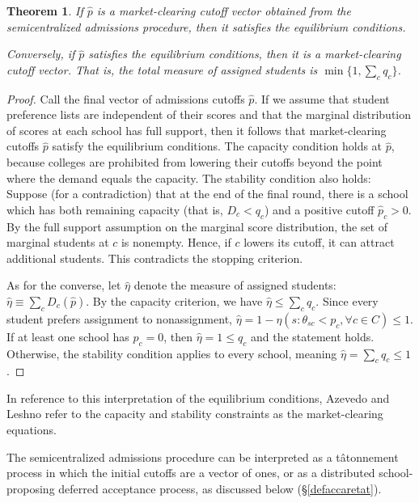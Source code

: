 \documentclass[12pt]{article}
\newtheorem{theorem}{Theorem}
\theoremstyle{definition}
\begin{document}
\begin{theorem}
If $\hat p$ is a market-clearing cutoff vector obtained from the semicentralized admissions procedure, then it satisfies the equilibrium conditions.

Conversely, if $\hat p$ satisfies the equilibrium conditions, then it is a market-clearing cutoff vector. That is, the total measure of assigned students is $\min\{1, \sum_c q_c\}$. 
\end{theorem}

\begin{proof}Call the final vector of admissions cutoffs $\hat p$. If we assume that student preference lists are independent of their scores and that the marginal distribution of scores at each school has full support, then it follows that market-clearing cutoffs $\hat p$ satisfy the equilibrium conditions. The capacity condition holds at $\hat p$, because colleges are prohibited from lowering their cutoffs beyond the point where the demand equals the capacity. The stability condition also holds: Suppose (for a contradiction) that at the end of the final round, there is a school which has both remaining capacity (that is, $D_c < q_c$) and a positive cutoff $\hat p_c > 0$. By the full support assumption on the marginal score distribution, the set of marginal students at $c$ is nonempty. Hence, if $c$ lowers its cutoff, it can attract additional students. This contradicts the stopping criterion.

As for the converse, let $\hat \eta$ denote the measure of assigned students: $\hat \eta \equiv \sum_c D_c(\hat p)$. By the capacity criterion, we have $\hat \eta \leq \sum_c q_c$. Since every student prefers assignment to nonassignment, $\hat \eta = 1 - \eta ( s: \theta_{sc} < p_c, \forall c \in C) \leq 1$. If at least one school has $p_c = 0$, then $\hat \eta = 1 \leq q_c$ and the statement holds. Otherwise, the stability condition applies to every school, meaning $\hat \eta = \sum_c q_c \leq 1$ . 
\end{proof}

In reference to this interpretation of the equilibrium conditions, Azevedo and Leshno \parencite*{supplydemandfw} refer to the capacity and stability constraints as the market-clearing equations. 

The semicentralized admissions procedure can be interpreted as a t\^{a}tonnement process in which the initial cutoffs are a vector of ones, or as a distributed school-proposing deferred acceptance process, as discussed below (\S\ref{defaccaretat}).
\end{document}
